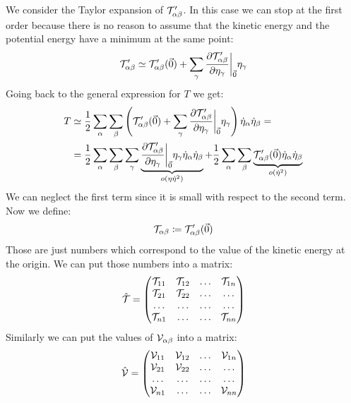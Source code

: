 We consider the Taylor expansion of $\mathcal{T}'_{\alpha \beta}$. In this case we can stop at the first order because there is no reason to assume that the kinetic energy and the potential energy have a minimum at the same point:
\begin{equation}
    \mathcal{T}'_{\alpha \beta} \simeq \mathcal{T}'_{\alpha \beta}(\vec{0}) + \displaystyle\sum_{\gamma}\dfrac{\partial \mathcal{T}'_{\alpha \beta}}{\partial \eta_{\gamma}}\bigg|_{\vec{0}}\eta_{\gamma}
\end{equation}
Going back to the general expression for $T$ we get:
\begin{equation}
    \begin{split}
        T &\simeq \dfrac{1}{2}\displaystyle\sum_{\alpha}\displaystyle\sum_{\beta}\left(\mathcal{T}'_{\alpha \beta}(\vec{0}) + \displaystyle\sum_{\gamma}\dfrac{\partial \mathcal{T}'_{\alpha \beta}}{\partial \eta_{\gamma}}\bigg|_{\vec{0}}\eta_{\gamma}\right) \dot{\eta}_{\alpha}\dot{\eta}_{\beta} =\\
        &= \dfrac{1}{2}\displaystyle\sum_{\alpha}\displaystyle\sum_{\beta}\displaystyle\sum_{\gamma}\underbrace{\dfrac{\partial \mathcal{T}'_{\alpha \beta}}{\partial \eta_{\gamma}}\bigg|_{\vec{0}}\eta_{\gamma} \dot{\eta}_{\alpha}\dot{\eta}_{\beta}}_{o(\eta \dot{\eta}^2)} + \dfrac{1}{2}\displaystyle\sum_{\alpha}\displaystyle\sum_{\beta}\underbrace{\mathcal{T}'_{\alpha \beta}(\vec{0})\dot{\eta}_{\alpha}\dot{\eta}_{\beta}}_{o(\dot{\eta}^2)}
    \end{split}
\end{equation}
We can neglect the first term since it is small with respect to the second term. Now we define:
\begin{equation}
    \mathcal{T}_{\alpha \beta} \coloneqq \mathcal{T}'_{\alpha \beta}(\vec{0})
\end{equation}
Those are just numbers which correspond to the value of the kinetic energy at the origin. We can put those numbers into a matrix:
\begin{equation}
    \hat{\mathcal{T}}=
    \begin{pmatrix}
        \mathcal{T}_{1 1} & \mathcal{T}_{1 2} & \dots & \mathcal{T}_{1 n}\\
        \mathcal{T}_{2 1} & \mathcal{T}_{2 2} & \dots & \dots\\
        \dots & \dots & \dots & \dots\\
        \mathcal{T}_{n 1} & \dots & \dots & \mathcal{T}_{n n}\\
    \end{pmatrix}
\end{equation}
Similarly we can put the values of $\mathcal{V}_{\alpha \beta}$ into a matrix:
\begin{equation}
    \hat{\mathcal{V}}=
    \begin{pmatrix}
        \mathcal{V}_{1 1} & \mathcal{V}_{1 2} & \dots & \mathcal{V}_{1 n}\\
        \mathcal{V}_{2 1} & \mathcal{V}_{2 2} & \dots & \dots\\
        \dots & \dots & \dots & \dots\\
        \mathcal{V}_{n 1} & \dots & \dots & \mathcal{V}_{n n}\\
    \end{pmatrix}
\end{equation}
